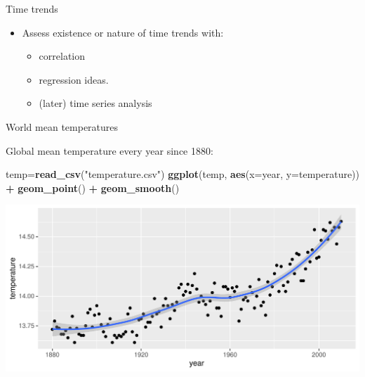 \documentclass[ignorenonframetext,]{beamer}
\newenvironment{Shaded}{\begin{snugshade}}{\end{snugshade}}
\newcommand{\DataTypeTok}[1]{\textcolor[rgb]{0.13,0.29,0.53}{#1}}
\newcommand{\KeywordTok}[1]{\textcolor[rgb]{0.13,0.29,0.53}{\textbf{#1}}}
\newcommand{\NormalTok}[1]{#1}
\newcommand{\OperatorTok}[1]{\textcolor[rgb]{0.81,0.36,0.00}{\textbf{#1}}}
\newcommand{\StringTok}[1]{\textcolor[rgb]{0.31,0.60,0.02}{#1}}
\providecommand{\tightlist}{%
  \setlength{\itemsep}{0pt}\setlength{\parskip}{0pt}}
\begin{document}
\begin{frame}{Time trends}
\protect\hypertarget{time-trends}{}

\begin{itemize}
\tightlist
\item
  Assess existence or nature of time trends with:

  \begin{itemize}
  \tightlist
  \item
    correlation
  \item
    regression ideas.
  \item
    (later) time series analysis
  \end{itemize}
\end{itemize}

\end{frame}

\begin{frame}[fragile]{World mean temperatures}
\protect\hypertarget{world-mean-temperatures}{}

Global mean temperature every year since 1880:

\small

\begin{Shaded}
\begin{Highlighting}[]
\NormalTok{temp=}\KeywordTok{read_csv}\NormalTok{(}\StringTok{"temperature.csv"}\NormalTok{)}
\KeywordTok{ggplot}\NormalTok{(temp, }\KeywordTok{aes}\NormalTok{(}\DataTypeTok{x=}\NormalTok{year, }\DataTypeTok{y=}\NormalTok{temperature)) }\OperatorTok{+}\StringTok{ }
\StringTok{  }\KeywordTok{geom_point}\NormalTok{() }\OperatorTok{+}\StringTok{ }\KeywordTok{geom_smooth}\NormalTok{()}
\end{Highlighting}
\end{Shaded}

\includegraphics{figure/unnamed-chunk-506-1.pdf} \normalsize

\end{frame}
\end{document}
